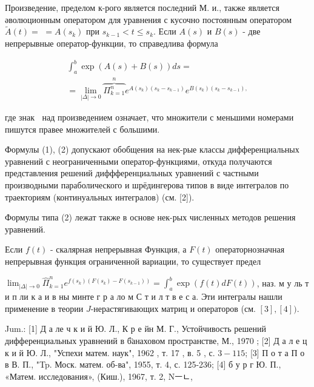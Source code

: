 \documentclass[10pt]{article}
\begin{document}
Произведение, пределом к-рого является последний М. и., также является әволюционным оператором для уравнения с кусочно постоянным оператором $\tilde{A}(t)=$ $=A\left(s_{k}\right)$ при $s_{k-1}<t \leqslant s_{k}$. Если $A(s)$ и $B(s)$ - две непрерывные оператор-функции, то справедлива формула



\[

\begin{gathered}

\int_{a}^{b} \exp (A(s)+B(s)) d s= \\

=\lim _{|\Delta| \rightarrow 0} \overbrace{\Pi_{k=1}^{n}}^{n} e^{A\left(s_{k}\right)\left(s_{k}-s_{k-1}\right)} e^{B\left(s_{k}\right)\left(s_{k}-s_{k-1}\right),}

\end{gathered}

\]



где знак $~$ над произведением означает, что множители с меньшими номерами пишутся правее множителей с большими.



Формулы (1), (2) допускают обобщения на нек-рые классы дифференциальных уравнений с неограниченными оператор-функциями, откуда получаются представления решений диффференциальных уравнений с частными производными параболического и шрёдингерова типов в виде интегралов по траекториям (континуальных интегралов) (см. [2]).



Формулы типа (2) лежат также в основе нек-рых численных методов решения уравнений.



Если $f(t)$ - скалярная непрерывная Функция, а $F(t)$ операторнозначная непрерывная функция ограниченной вариации, то существует предел



$\lim _{|\Delta| \rightarrow 0} \hat{\Pi}_{k=1}^{n} e^{f\left(s_{k}\right)\left(F\left(s_{k}\right)-F\left(s_{k-1}\right)\right)}=\int_{a}^{b} \exp (f(t) d F(t))$, наз. м у ль т и п ли к а и в ны минте г р а ло м С т и л т в е с а. Эти интегралы нашли применение в теории $J$-нерастягивающих матриц и операторов (см. $[3],[4])$.



Jum.: [1] Д а ле ч к и й Ю. Л., К р е йн М. Г., Устойчивость решений дифференциальных уравнений в б̈анаховом пространстве, М., 1970 ; [2] Д а л е ц к и й Ю. Л., "Успехи матем. наук", 1962 , т. 17 , в. 5 , с. $3-115$; [3] П о т а П о в В. П., "Tp. Моск. матем. об-ва", 1955, т. 4, с. 125-236; [4] б у р г Ю. П., «Матем. исследования», (Киш.), 1967, т. 2, Nㅡㄴ,
\end{document}
